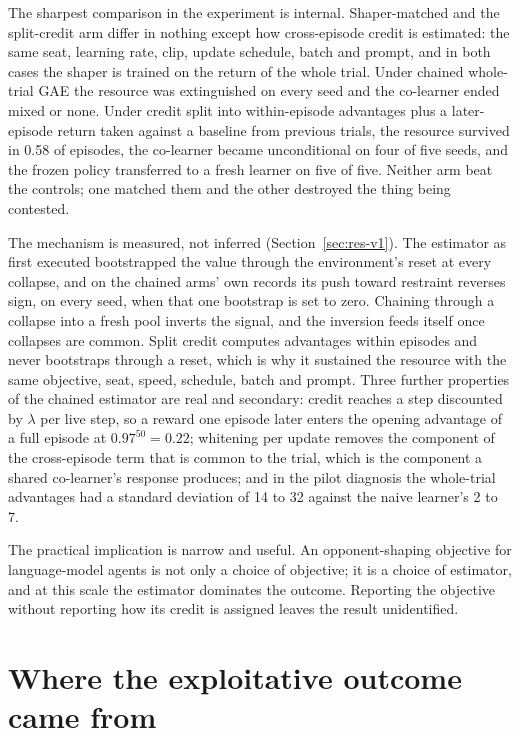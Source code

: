 The sharpest comparison in the experiment is internal.
Shaper-matched and the split-credit arm differ in nothing except how
cross-episode credit is estimated: the same seat, learning rate, clip,
update schedule, batch and prompt, and in both cases the shaper is trained
on the return of the whole trial.
Under chained whole-trial GAE the resource was extinguished on every seed
and the co-learner ended mixed or none.
Under credit split into within-episode advantages plus a later-episode
return taken against a baseline from previous trials, the resource survived
in 0.58 of episodes, the co-learner became unconditional on four of five
seeds, and the frozen policy transferred to a fresh learner on five of five.
Neither arm beat the controls; one matched them and the other destroyed the
thing being contested.

The mechanism is measured, not inferred (Section~\ref{sec:res-v1}).
The estimator as first executed bootstrapped the value through the
environment's reset at every collapse, and on the chained arms' own
records its push toward restraint reverses sign, on every seed, when that
one bootstrap is set to zero.
Chaining through a collapse into a fresh pool inverts the signal, and the
inversion feeds itself once collapses are common.
Split credit computes advantages within episodes and never bootstraps
through a reset, which is why it sustained the resource with the same
objective, seat, speed, schedule, batch and prompt.
Three further properties of the chained estimator are real and secondary:
credit reaches a step discounted by \(\lambda\) per live step, so a reward
one episode later enters the opening advantage of a full episode at
\(0.97^{50}=0.22\); whitening per update removes the component of the
cross-episode term that is common to the trial, which is the component a
shared co-learner's response produces; and in the pilot diagnosis the
whole-trial advantages had a standard deviation of 14 to 32 against the
naive learner's 2 to 7.

The practical implication is narrow and useful.
An opponent-shaping objective for language-model agents is not only a choice
of objective; it is a choice of estimator, and at this scale the estimator
dominates the outcome.
Reporting the objective without reporting how its credit is assigned leaves
the result unidentified.

\section{Where the exploitative outcome came from}
\label{sec:disc-m3}

